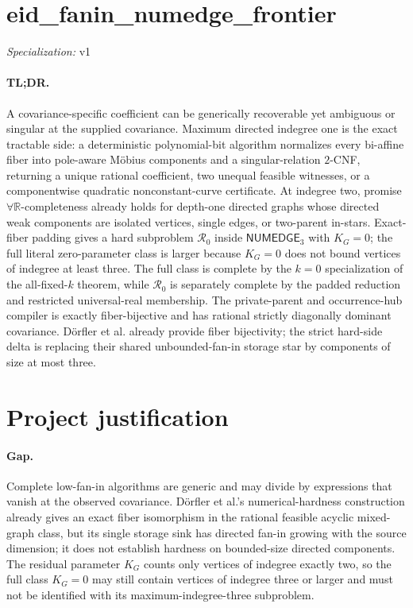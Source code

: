 \documentclass{article}
\begin{document}
\sloppy

\section*{eid\_\allowbreak{}fanin\_\allowbreak{}numedge\_\allowbreak{}frontier}

\noindent\textit{Specialization:} v1\par

\paragraph{TL;DR.} A covariance-specific coefficient can be generically recoverable yet ambiguous or singular at the supplied covariance. Maximum directed indegree one is the exact tractable side: a deterministic polynomial-bit algorithm normalizes every bi-affine fiber into pole-aware Möbius components and a singular-relation \(2\)-CNF, returning a unique rational coefficient, two unequal feasible witnesses, or a componentwise quadratic nonconstant-curve certificate. At indegree two, promise \(\forall\mathbb R\)-completeness already holds for depth-one directed graphs whose directed weak components are isolated vertices, single edges, or two-parent in-stars. Exact-fiber padding gives a hard subproblem \(\mathcal R_0\) inside \(\mathsf{NUMEDGE}_3\) with \(K_G=0\); the full literal zero-parameter class is larger because \(K_G=0\) does not bound vertices of indegree at least three. The full class is complete by the \(k=0\) specialization of the all-fixed-\(k\) theorem, while \(\mathcal R_0\) is separately complete by the padded reduction and restricted universal-real membership. The private-parent and occurrence-hub compiler is exactly fiber-bijective and has rational strictly diagonally dominant covariance. Dörfler et al. already provide fiber bijectivity; the strict hard-side delta is replacing their shared unbounded-fan-in storage star by components of size at most three.

\section{Project justification}

\paragraph{Gap.} Complete low-fan-in algorithms are generic and may divide by expressions that vanish at the observed covariance. Dörfler et al.'s numerical-hardness construction already gives an exact fiber isomorphism in the rational feasible acyclic mixed-graph class, but its single storage sink has directed fan-in growing with the source dimension; it does not establish hardness on bounded-size directed components. The residual parameter \(K_G\) counts only vertices of indegree exactly two, so the full class \(K_G=0\) may still contain vertices of indegree three or larger and must not be identified with its maximum-indegree-three subproblem.
\end{document}
